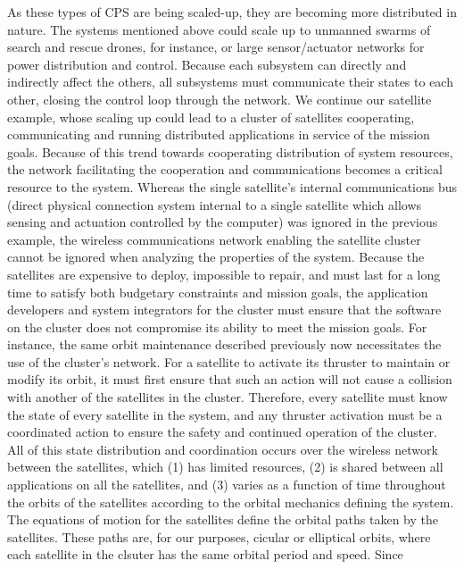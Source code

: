 As these types of CPS are being scaled-up, they are becoming more
distributed in nature.  The systems mentioned above could scale up to
unmanned swarms of search and rescue drones, for instance, or large
sensor/actuator networks for power distribution and control. Because
each subsystem can directly and indirectly affect the others, all
subsystems must communicate their states to each other, closing the
control loop through the network.  We continue our satellite example,
whose scaling up could lead to a cluster of satellites cooperating,
communicating and running distributed applications in service of the
mission goals.  Because of this trend towards cooperating distribution
of system resources, the network facilitating the cooperation and
communications becomes a critical resource to the system.  Whereas the
single satellite's internal communications bus (direct physical
connection system internal to a single satellite which allows sensing
and actuation controlled by the computer) was ignored in the previous
example, the wireless communications network enabling the satellite
cluster cannot be ignored when analyzing the properties of the system.
Because the satellites are expensive to deploy, impossible to repair,
and must last for a long time to satisfy both budgetary constraints
and mission goals, the application developers and system integrators
for the cluster must ensure that the software on the cluster does not
compromise its ability to meet the mission goals.  For instance, the
same orbit maintenance described previously now necessitates the use
of the cluster's network.  For a satellite to activate its thruster to
maintain or modify its orbit, it must first ensure that such an action
will not cause a collision with another of the satellites in the
cluster.  Therefore, every satellite must know the state of every
satellite in the system, and any thruster activation must be a
coordinated action to ensure the safety and continued operation of the
cluster.  All of this state distribution and coordination occurs over
the wireless network between the satellites, which (1) has limited
resources, (2) is shared between all applications on all the
satellites, and (3) varies as a function of time throughout the orbits
of the satellites according to the orbital mechanics defining the
system.  The equations of motion for the satellites define the orbital
paths taken by the satellites\cite{fundamentals_astrodynamics}.  These
paths are, for our purposes, cicular or elliptical orbits, where each
satellite in the clsuter has the same orbital period and speed.  Since
